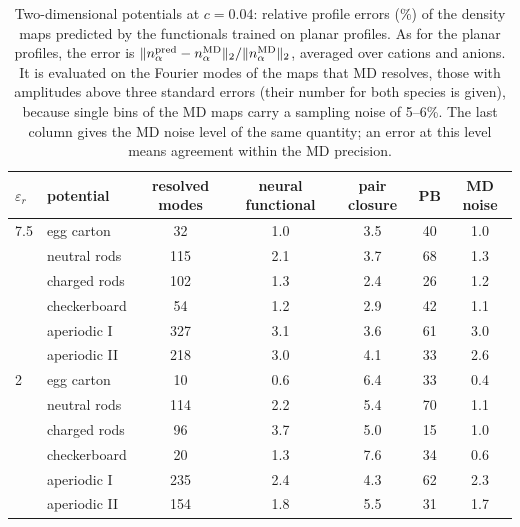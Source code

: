 \begin{table}[H]
\centering
\caption{Two-dimensional potentials at $c=0.04$: relative profile errors (\%) of the density maps predicted by the functionals trained on planar profiles. As for the planar profiles, the error is $\|n^{\rm pred}_\alpha-n^{\rm MD}_\alpha\|_2/\|n^{\rm MD}_\alpha\|_2$, averaged over cations and anions. It is evaluated on the Fourier modes of the maps that MD resolves, those with amplitudes above three standard errors (their number for both species is given), because single bins of the MD maps carry a sampling noise of 5--6\%. The last column gives the MD noise level of the same quantity; an error at this level means agreement within the MD precision.}
\label{tab:S:field2d}
\begin{tabular}{llccccc}
$\varepsilon_r$ & potential & resolved modes & neural functional & pair closure & PB & MD noise\\
\midrule
7.5 & egg carton & 32 & 1.0 & 3.5 & 40 & 1.0\\
 & neutral rods & 115 & 2.1 & 3.7 & 68 & 1.3\\
 & charged rods & 102 & 1.3 & 2.4 & 26 & 1.2\\
 & checkerboard & 54 & 1.2 & 2.9 & 42 & 1.1\\
 & aperiodic I & 327 & 3.1 & 3.6 & 61 & 3.0\\
 & aperiodic II & 218 & 3.0 & 4.1 & 33 & 2.6\\
2 & egg carton & 10 & 0.6 & 6.4 & 33 & 0.4\\
 & neutral rods & 114 & 2.2 & 5.4 & 70 & 1.1\\
 & charged rods & 96 & 3.7 & 5.0 & 15 & 1.0\\
 & checkerboard & 20 & 1.3 & 7.6 & 34 & 0.6\\
 & aperiodic I & 235 & 2.4 & 4.3 & 62 & 2.3\\
 & aperiodic II & 154 & 1.8 & 5.5 & 31 & 1.7\\
\bottomrule
\end{tabular}
\end{table}

